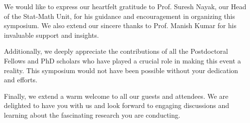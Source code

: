 We would like to express our heartfelt gratitude to Prof. Suresh Nayak, our Head of the Stat-Math Unit, for his guidance and encouragement in organizing this symposium. We also extend our sincere thanks to Prof. Manish Kumar for his invaluable support and insights.

Additionally, we deeply appreciate the contributions of all the Postdoctoral Fellows and PhD scholars who have played a crucial role in making this event a reality. This symposium would not have been possible without your dedication and efforts.

Finally, we extend a warm welcome to all our guests and attendees. We are delighted to have you with us and look forward to engaging discussions and learning about the fascinating research you are conducting.
